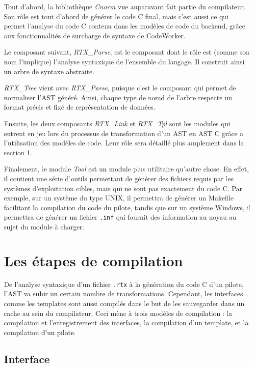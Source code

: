 \documentclass[french]{rtxreport}
\begin{document}
Tout d'abord, la bibliothèque \emph{Cnorm} vue auparavant fait partie du
compilateur. Son rôle est tout d'abord de générer le code C final, mais c'est
aussi ce qui permet l'analyse du code C contenu dans les modèles de code du
backend, grâce aux fonctionnalités de surcharge de syntaxe de CodeWorker.

Le composant suivant, \emph{RTX\_Parse}, est le composant dont le rôle est
(comme son nom l'implique) l'analyse syntaxique de l'ensemble du langage. Il
construit ainsi un arbre de syntaxe abstraite.

\emph{RTX\_Tree} vient avec \emph{RTX\_Parse}, puisque c'est le composant qui
permet de normaliser l'AST généré. Ainsi, chaque type de nœud de l'arbre
respecte un format précis et fixé de représentation de données.

Ensuite, les deux composants \emph{RTX\_Link} et \emph{RTX\_Tpl} sont les
modules qui entrent en jeu lors du processus de transformation d'un AST \rtx en
AST C grâce a l'utilisation des modèles de code. Leur rôle sera détaillé plus
amplement dans la section \ref{sec:compilationSteps}.

Finalement, le module \emph{Tool} est un module plus utilitaire qu'autre chose.
En effet, il contient une série d'outils permettant de générer des fichiers
requis par les systèmes d'exploitation cibles, mais qui ne sont pas exactement
du code C. Par exemple, sur un système du type UNIX, il permettra de générer un
Makefile facilitant la compilation du code du pilote, tandis que sur un système
Windows, il permettra de générer un fichier \texttt{.inf} qui fournit des
information au noyau au sujet du module à charger.


\section{Les étapes de compilation}
\label{sec:compilationSteps}

De l'analyse syntaxique d'un fichier \texttt{.rtx} à la génération du code C
d'un pilote, l'AST va subir un certain nombre de transformations. Cependant,
les interfaces comme les templates sont aussi compilés dans le but de les
sauvegarder dans un cache au sein du compilateur. Ceci mène à trois modèles de
compilation : la compilation et l'enregistrement des interfaces, la compilation
d'un template, et la compilation d'un pilote.

\subsection{Interface}
\end{document}
